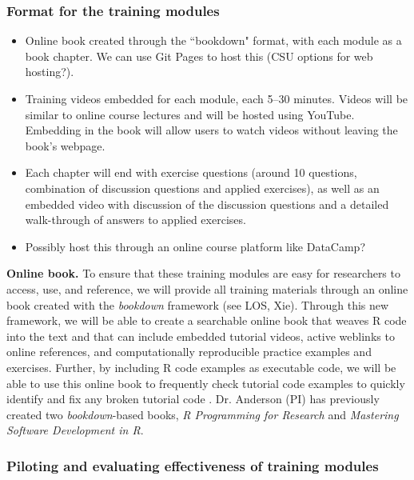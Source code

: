 \documentclass[pdftex,english,11pt,parskip=half]{scrartcl}
\begin{document}






\subsubsection{Format for the training modules}

\begin{itemize}
\item Online book created through the ``bookdown" format, with each module as a book chapter. We can use Git Pages to host this (CSU options for web hosting?).
\item Training videos embedded for each module, each 5--30 minutes. Videos will be similar to online course lectures and will be hosted using YouTube. Embedding in the book will allow users to watch videos without leaving the book's webpage. 
\item Each chapter will end with exercise questions (around 10 questions, combination of discussion questions and applied exercises), as well as an embedded video with discussion of the discussion questions and a detailed walk-through of answers to applied exercises. 
\item Possibly host this through an online course platform like DataCamp?
\end{itemize}

\textbf{Online book.} To ensure that these training modules are easy for researchers to access, use, and reference, we will provide all training materials through an online book created with the \textit{bookdown} framework \cite{xie2016bookdown} (see LOS, Xie). Through this new framework, we will be able to create a searchable online book that weaves R code into the text and that can include embedded tutorial videos, active weblinks to online references, and computationally reproducible practice examples and exercises. Further, by including R code examples as executable code, we will be able to use this online book to frequently check tutorial code examples to quickly identify and fix any broken tutorial code \cite{xie2016bookdown}.  Dr. Anderson (PI) has previously created two \textit{bookdown}-based books, \textit{R Programming for Research} and \textit{Mastering Software Development in R}.  

\subsubsection{Piloting and evaluating effectiveness of training modules}
\end{document}
